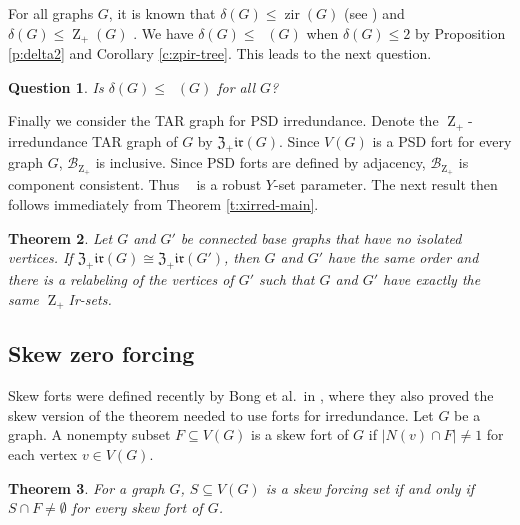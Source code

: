 \documentclass{article}
\numberwithin{figure}{section}
\numberwithin{table}{section}
\numberwithin{equation}{section}
\newtheorem{thm}{Theorem}[section]
\newtheorem{quest}[thm]{Question}
\theoremstyle{definition}
\theoremstyle{definition}
\theoremstyle{definition}
\newcommand{\B}{\mathcal{B}}
\newcommand{\Zp}{\operatorname{Z}_+}
\newcommand{\zpirtar}{\mathfrak{Z_+ir}}%
\DeclareMathOperator{\zir}{zir}
\DeclareMathOperator{\zpir}{z_+ir}
\DeclareMathOperator{\ZpIR}{Z_+IR}
\begin{document}
For all graphs $G$, it is known that $\delta(G)\le \zir(G)$ (see \cite[Corollary 2.11]{ZIR}) and  $\delta(G)\le \Zp(G)$  \cite[Theorem 9.38]{HLS22book}.  We have $\delta(G)\le \zpir(G)$ when $\delta(G)\le 2$ by Proposition \ref{p:delta2} and Corollary \ref{c:zpir-tree}. This leads to the next question.

\begin{quest}\label{q:delta-Z+} Is $\delta(G)\le \zpir(G)$ for all $G$? 
\end{quest}












Finally we consider the TAR graph for PSD irredundance.  Denote the $\Zp$-irredundance TAR graph of $G$ by $\zpirtar(G)$. Since $V(G)$ is a PSD fort for every graph $G$, $\B_{\Zp}$ is inclusive.  Since PSD forts are defined by adjacency,  $\B_{\Zp}$ is component consistent. Thus $\ZpIR$ is a robust $Y$-set parameter. The next result then follows immediately from Theorem \ref{t:xirred-main}.

\begin{thm}\label{t:Zpirred-main}
Let $G$ and $G'$ be connected base graphs that have no isolated vertices. If $\zpirtar(G)\cong\zpirtar(G')$, then $G$ and $G'$ have the same order and there is a relabeling of the vertices of $G'$ such that $G$ and $G'$ have exactly the same $\Zp$Ir-sets.
\end{thm}


\subsection{Skew zero forcing}\label{ss:skew-ired}




Skew forts were defined recently by Bong et al.~in \cite{skewTErecon}, where they also proved the skew version of the theorem needed to use forts for irredundance. Let $G$ be a graph. A nonempty subset  $F\subseteq V(G)$  is a skew fort of $G$ if $|N(v) \cap F|\ne 1$  for each vertex $v\in V(G)$.
 
 \begin{thm} \label{skewfortthm}  {\rm \cite[Theorem 2.2.9]{skewTErecon}}
For a graph $G$, $S\subseteq V(G)$ is a skew forcing set if and only if $S\cap F\ne \emptyset$ for every skew fort of $G$.
\end{thm} 
\end{document}
